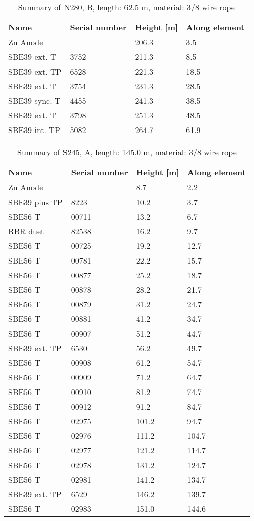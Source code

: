 \documentclass{article}
\begin{document}
\begin{table}[!htbp]
\centering
\caption{Summary of N280, B, length: 62.5 m, material: 3/8 wire rope}
\begin{tabular}{llll}
\toprule
Name & Serial number & Height [m] & Along element \\
\midrule
Zn Anode &  & 206.3 & 3.5 \\
SBE39 ext. T & 3752 & 211.3 & 8.5 \\
SBE39 ext. TP & 6528 & 221.3 & 18.5 \\
SBE39 ext. T & 3754 & 231.3 & 28.5 \\
SBE39 sync. T & 4455 & 241.3 & 38.5 \\
SBE39 ext. T & 3798 & 251.3 & 48.5 \\
SBE39 int. TP & 5082 & 264.7 & 61.9 \\
\bottomrule
\end{tabular}
\end{table}

\begin{table}[!htbp]
\centering
\caption{Summary of S245, A, length: 145.0 m, material: 3/8 wire rope}
\begin{tabular}{llll}
\toprule
Name & Serial number & Height [m] & Along element \\
\midrule
Zn Anode &  & 8.7 & 2.2 \\
SBE39 plus TP & 8223 & 10.2 & 3.7 \\
SBE56 T & 00711 & 13.2 & 6.7 \\
RBR duet & 82538 & 16.2 & 9.7 \\
SBE56 T & 00725 & 19.2 & 12.7 \\
SBE56 T & 00781 & 22.2 & 15.7 \\
SBE56 T & 00877 & 25.2 & 18.7 \\
SBE56 T & 00878 & 28.2 & 21.7 \\
SBE56 T & 00879 & 31.2 & 24.7 \\
SBE56 T & 00881 & 41.2 & 34.7 \\
SBE56 T & 00907 & 51.2 & 44.7 \\
SBE39 ext. TP & 6530 & 56.2 & 49.7 \\
SBE56 T & 00908 & 61.2 & 54.7 \\
SBE56 T & 00909 & 71.2 & 64.7 \\
SBE56 T & 00910 & 81.2 & 74.7 \\
SBE56 T & 00912 & 91.2 & 84.7 \\
SBE56 T & 02975 & 101.2 & 94.7 \\
SBE56 T & 02976 & 111.2 & 104.7 \\
SBE56 T & 02977 & 121.2 & 114.7 \\
SBE56 T & 02978 & 131.2 & 124.7 \\
SBE56 T & 02981 & 141.2 & 134.7 \\
SBE39 ext. TP & 6529 & 146.2 & 139.7 \\
SBE56 T & 02983 & 151.0 & 144.6 \\
\bottomrule
\end{tabular}
\end{table}
\end{document}
